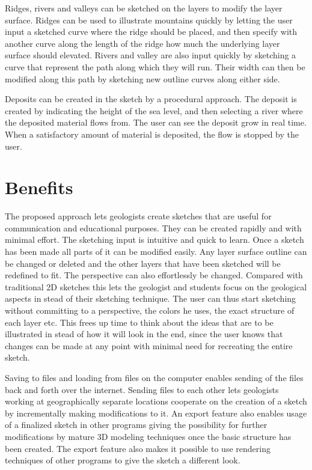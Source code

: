 \documentclass[a4paper,12pt]{report}
\begin{document}
Ridges, rivers and valleys can be sketched on the layers to modify the layer surface. Ridges can be used to illustrate mountains quickly by letting the user input a sketched curve where the ridge should be placed, and then specify with another curve along the length of the ridge how much the underlying layer surface should elevated. Rivers and valley are also input quickly by sketching a curve that represent the path along which they will run. Their width can then be modified along this path by sketching new outline curves along either side.	

Deposits can be created in the sketch by a procedural approach. The deposit is created by indicating the height of the sea level, and then selecting a river where the deposited material flows from. The user can see the deposit grow in real time. When a satisfactory amount of material is deposited, the flow is stopped by the user.

\section{Benefits}
The proposed approach lets geologists create sketches that are useful for communication and educational purposes. They can be created rapidly and with minimal effort. The sketching input is intuitive and quick to learn. Once a sketch has been made all parts of it can be modified easily. Any layer surface outline can be changed or deleted and the other layers that have been sketched will be redefined to fit. The perspective can also effortlessly be changed. Compared with traditional 2D sketches this lets the geologist and students focus on the geological aspects in stead of their sketching technique. The user can thus start sketching without committing to a perspective, the colors he uses, the exact structure of each layer etc. This frees up time to think about the ideas that are to be illustrated in stead of how it will look in the end, since the user knows that changes can be made at any point with minimal need for recreating the entire sketch.

Saving to files and loading from files on the computer enables sending of the files back and forth over the internet. Sending files to each other lets geologists working at geographically separate locations cooperate on the creation of a sketch by incrementally making modifications to it. An export feature also enables usage of a finalized sketch in other programs giving the possibility for further modifications by mature 3D modeling techniques once the basic structure has been created. The export feature also makes it possible to use rendering techniques of other programs to give the sketch a different look.
\end{document}
